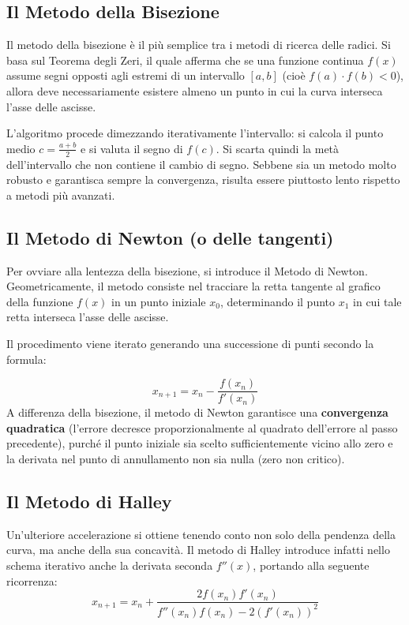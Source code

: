 \documentclass[12pt,a4paper]{article}
\begin{document}
\subsection{Il Metodo della Bisezione}
Il metodo della bisezione è il più semplice tra i metodi di ricerca delle radici. Si basa sul Teorema degli Zeri, il quale afferma che se una funzione continua $f(x)$ assume segni opposti agli estremi di un intervallo $[a, b]$ (cioè $f(a) \cdot f(b) < 0$), allora deve necessariamente esistere almeno un punto in cui la curva interseca l'asse delle ascisse.

L'algoritmo procede dimezzando iterativamente l'intervallo: si calcola il punto medio $c = \frac{a+b}{2}$ e si valuta il segno di $f(c)$. Si scarta quindi la metà dell'intervallo che non contiene il cambio di segno. Sebbene sia un metodo molto robusto e garantisca sempre la convergenza, risulta essere piuttosto lento rispetto a metodi più avanzati.

\subsection{Il Metodo di Newton (o delle tangenti)}
Per ovviare alla lentezza della bisezione, si introduce il Metodo di Newton. Geometricamente, il metodo consiste nel tracciare la retta tangente al grafico della funzione $f(x)$ in un punto iniziale $x_0$, determinando il punto $x_1$ in cui tale retta interseca l'asse delle ascisse. 

Il procedimento viene iterato generando una successione di punti secondo la formula:

\begin{equation}
x_{n+1} = x_n - \frac{f(x_n)}{f'(x_n)}
\end{equation}
A differenza della bisezione, il metodo di Newton garantisce una \textbf{convergenza quadratica} (l'errore decresce proporzionalmente al quadrato dell'errore al passo precedente), purché il punto iniziale sia scelto sufficientemente vicino allo zero e la derivata nel punto di annullamento non sia nulla (zero non critico).

\subsection{Il Metodo di Halley}
Un'ulteriore accelerazione si ottiene tenendo conto non solo della pendenza della curva, ma anche della sua concavità. Il metodo di Halley introduce infatti nello schema iterativo anche la derivata seconda $f''(x)$, portando alla seguente ricorrenza:
\begin{equation}
x_{n+1} = x_n + \frac{2f(x_n)f'(x_n)}{f''(x_n)f(x_n) - 2(f'(x_n))^2}
\end{equation}
\end{document}
